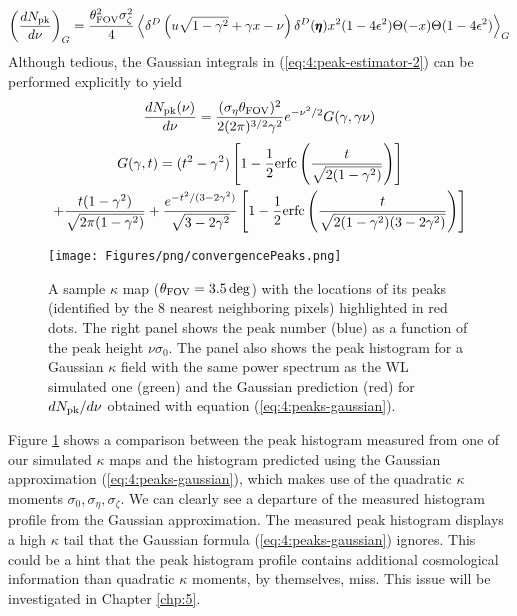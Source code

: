 \begin{equation}
\label{eq:4:peak-estimator-2}
\left(\frac{dN_{\rm pk}}{d\nu}\right)_G = \frac{\theta^2_{\rm FOV}\sigma^2_\zeta}{4}\left\langle\delta^D\left(u\sqrt{1-\gamma^2}+\gamma x-\nu\right)\delta^D(\pmb{\eta})x^2(1-4\epsilon^2)\Theta(-x)\Theta(1-4\epsilon^2)\right\rangle_G
\end{equation}
%
Although tedious, the Gaussian integrals in (\ref{eq:4:peak-estimator-2}) can be performed explicitly \citep{BondCMB} to yield
%
\begin{equation}
\label{eq:4:peaks-gaussian}
\frac{dN_{\rm pk}(\nu)}{d\nu} = \frac{(\sigma_\eta\theta_{\rm FOV})^2}{2(2\pi)^{3/2} \gamma^2}e^{-\nu^2/2}G(\gamma,\gamma\nu)
\end{equation}
%
\begin{equation}
\label{eq:4:Gdef}
\begin{gathered}
G(\gamma,t) = (t^2-\gamma^2)\left[1-\frac{1}{2}{\rm erfc}\left(\frac{t}{\sqrt{2(1-\gamma^2)}}\right)\right] \\
+ \frac{t(1-\gamma^2)}{\sqrt{2\pi(1-\gamma^2)}} + \frac{e^{-t^2/(3-2\gamma^2)}}{\sqrt{3-2\gamma^2}}\left[1-\frac{1}{2}{\rm erfc}\left(\frac{t}{\sqrt{2(1-\gamma^2)(3-2\gamma^2)}}\right)\right]
\end{gathered}
\end{equation}
%
\begin{figure}
\begin{center}
\texttt{[image: Figures/png/convergencePeaks.png]}
\end{center}
\caption{A sample $\kappa$ map ($\theta_{\rm FOV}=3.5\,{\rm deg}$) with the locations of its peaks (identified by the 8 nearest neighboring pixels) highlighted in red dots. The right panel shows the peak number (blue) as a function of the peak height $\nu\sigma_0$. The panel also shows the peak histogram for a Gaussian $\kappa$ field with the same power spectrum as the WL simulated one (green) and the Gaussian prediction (red) for $dN_{\rm pk}/d\nu$ obtained with equation (\ref{eq:4:peaks-gaussian}).}
\label{fig:4:peaks}
\end{figure}
%
Figure \ref{fig:4:peaks} shows a comparison between the peak histogram measured from one of our simulated $\kappa$ maps and the histogram predicted using the Gaussian approximation (\ref{eq:4:peaks-gaussian}), which makes use of the quadratic $\kappa$ moments $\sigma_0,\sigma_\eta,\sigma_\zeta$. We can clearly see a departure of the measured histogram profile from the Gaussian approximation. The measured peak histogram displays a high $\kappa$ tail that the Gaussian formula (\ref{eq:4:peaks-gaussian}) ignores. This could be a hint that the peak histogram profile contains additional cosmological information than quadratic $\kappa$ moments, by themselves, miss. This issue will be investigated in Chapter \ref{chp:5}.    

